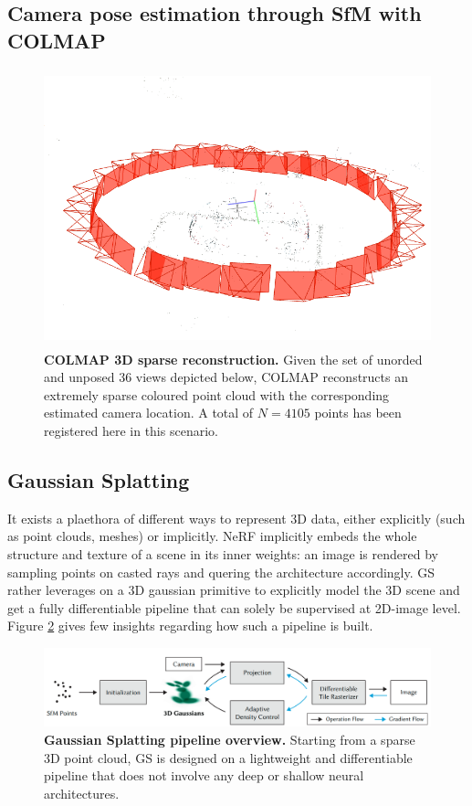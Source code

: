 \subsection{Camera pose estimation through SfM with COLMAP}
\label{subsec:gs-sfm}

\begin{figure}[htb!]
    \center
  \includegraphics[height=8cm]{images/gaussiansplatting/colmap_sparsePC.png}
  \caption{\textbf{COLMAP 3D sparse reconstruction.} Given the set of unorded and unposed 36 views depicted below, COLMAP reconstructs an extremely sparse coloured point cloud with the corresponding estimated camera location. A total of $N=4105$ points has been registered here in this scenario.}
  \label{fig:gs-sfm}
\end{figure}


\subsection{Gaussian Splatting}
\label{subsec:gs-gs}

It exists a plaethora of different ways to represent 3D data, either explicitly (such as point clouds, meshes) or implicitly. \ac{NeRF} implicitly embeds the whole structure and texture of a scene in its inner weights: an image is rendered by sampling points on casted rays and quering the architecture accordingly. \ac{GS} rather leverages on a 3D gaussian primitive to explicitly model the 3D scene and get a fully differentiable pipeline that can solely be supervised at 2D-image level. Figure \ref{fig:gs-overview} gives few insights regarding how such a pipeline is built.  

\begin{figure}[htb!]
    \center
  \includegraphics[width=\linewidth]{images/gaussiansplatting/overview-pipelineGS.png}
  \caption{\textbf{Gaussian Splatting pipeline overview.} Starting from a sparse 3D point cloud, \ac{GS} is designed on a lightweight and differentiable pipeline that does not involve any deep or shallow neural architectures.}
  \label{fig:gs-overview}
\end{figure}

